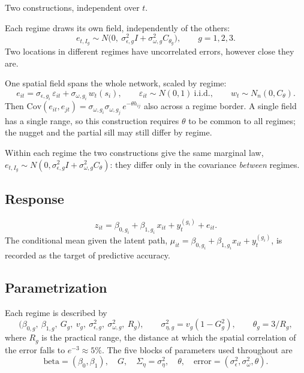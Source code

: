\documentclass[11pt]{article}
\newcommand{\Cov}{\mathrm{Cov}}
\begin{document}
Two constructions, independent over $t$.
\begin{description}[leftmargin=1.5em]
  \item[Fields by regime.] Each regime draws its own field, independently of the others:
  \begin{equation}\label{eq:blockfield}
    e_{t,I_g} \sim N\bigl(0,\ \sigma^2_{\epsilon,g} I + \sigma^2_{\omega,g} C_{\theta_g}\bigr), \qquad g = 1,2,3.
  \end{equation}
  Two locations in different regimes have uncorrelated errors, however close they are.
  \item[One field.] One spatial field spans the whole network, scaled by regime:
  \begin{equation}\label{eq:onefield}
    e_{it} = \sigma_{\epsilon,g_i}\, \varepsilon_{it} + \sigma_{\omega,g_i}\, w_t(s_i), \qquad
    \varepsilon_{it} \sim N(0,1)\ \text{i.i.d.}, \qquad w_t \sim N_n(0, C_\theta).
  \end{equation}
  Then $\Cov(e_{it}, e_{jt}) = \sigma_{\omega,g_i}\sigma_{\omega,g_j}\, e^{-\theta h_{ij}}$ also across a regime border. A single field has a single range, so this construction requires $\theta$ to be common to all regimes; the nugget and the partial sill may still differ by regime.
\end{description}
Within each regime the two constructions give the same marginal law, $e_{t,I_g} \sim N(0, \sigma^2_{\epsilon,g} I + \sigma^2_{\omega,g} C_\theta)$: they differ only in the covariance \emph{between} regimes.

\subsection{Response}

\begin{equation}\label{eq:resp}
  z_{it} = \beta_{0,g_i} + \beta_{1,g_i}\, x_{it} + y^{(g_i)}_t + e_{it}.
\end{equation}
The conditional mean given the latent path, $\mu_{it} = \beta_{0,g_i} + \beta_{1,g_i} x_{it} + y^{(g_i)}_t$, is recorded as the target of predictive accuracy.

\subsection{Parametrization}

Each regime is described by
\[
  \bigl(\beta_{0,g},\ \beta_{1,g},\ G_g,\ v_g,\ \sigma^2_{\epsilon,g},\ \sigma^2_{\omega,g},\ R_g\bigr),
  \qquad \sigma^2_{\eta,g} = v_g(1-G_g^2), \qquad \theta_g = 3/R_g,
\]
where $R_g$ is the practical range, the distance at which the spatial correlation of the error falls to $e^{-3} \approx 5\%$. The five blocks of parameters used throughout are
\[
  \text{beta} = (\beta_0, \beta_1), \quad G, \quad \Sigma_\eta = \sigma^2_\eta, \quad \theta, \quad \text{error} = (\sigma^2_\epsilon, \sigma^2_\omega, \theta).
\]
\end{document}
